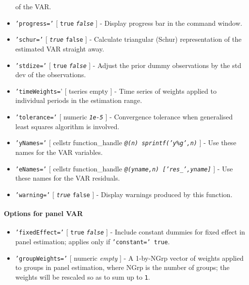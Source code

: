 \begin{itemize}
  of the VAR.
\item
  \texttt{'progress='} {[} \texttt{true} \textbar{}
  \emph{\texttt{false}} {]} - Display progress bar in the command
  window.
\item
  \texttt{'schur='} {[} \emph{\texttt{true}} \textbar{} \texttt{false}
  {]} - Calculate triangular (Schur) representation of the estimated VAR
  straight away.
\item
  \texttt{'stdize='} {[} \texttt{true} \textbar{} \emph{\texttt{false}}
  {]} - Adjust the prior dummy observations by the std dev of the
  observations.
\item
  \texttt{'timeWeights=}' {[} tseries \textbar{} empty {]} - Time series
  of weights applied to individual periods in the estimation range.
\item
  \texttt{'tolerance='} {[} numeric \textbar{} \emph{\texttt{1e-5}} {]}
  - Convergence tolerance when generalised least squares algorithm is
  involved.
\item
  \texttt{'yNames='} {[} cellstr \textbar{} function\_handle \textbar{}
  \emph{\texttt{@(n) sprintf('y\%g',n)}} {]} - Use these names for the
  VAR variables.
\item
  \texttt{'eNames='} {[} cellstr \textbar{} function\_handle \textbar{}
  \emph{\texttt{@(yname,n) {[}'res\_',yname{]}}} {]} - Use these names
  for the VAR residuals.
\item
  \texttt{'warning='} {[} \emph{\texttt{true}} \textbar{} \texttt{false}
  {]} - Display warnings produced by this function.
\end{itemize}

\paragraph{Options for panel VAR}\label{options-for-panel-var}

\begin{itemize}
\item
  \texttt{'fixedEffect='} {[} \texttt{true} \textbar{}
  \emph{\texttt{false}} {]} - Include constant dummies for fixed effect
  in panel estimation; applies only if \texttt{'constant=' true}.
\item
  \texttt{'groupWeights='} {[} numeric \textbar{} \emph{empty} {]} - A
  1-by-NGrp vector of weights applied to groups in panel estimation,
  where NGrp is the number of groups; the weights will be rescaled so as
  to sum up to \texttt{1}.
\end{itemize}

